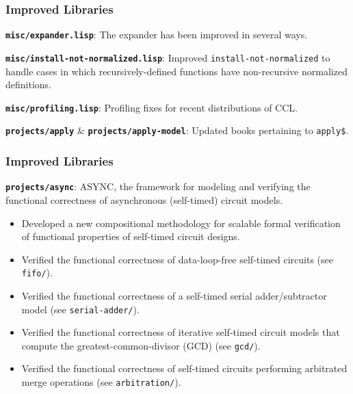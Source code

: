 \documentclass{beamer}
\newcommand{\code}[1]{\texttt{#1}}
\newcommand{\bookpath}[1]{\textbf{\code{#1}}}
\newcommand{\implibtitle}{\frametitle{Improved Libraries}}
\newcommand{\separation}{\vspace*{1ex}}
\begin{document}

\begin{frame}

\implibtitle

\bookpath{misc/expander.lisp}:
The expander has been improved in several ways.

\separation

\bookpath{misc/install-not-normalized.lisp}:
Improved \code{install-not-normalized} to handle cases in which
recursively-defined functions have non-recursive normalized
definitions.

\separation

\bookpath{misc/profiling.lisp}:
Profiling fixes for recent distributions of CCL.

\separation

\bookpath{projects/apply} \& \bookpath{projects/apply-model}:
Updated books pertaining to \code{apply\$}.

\end{frame}


\begin{frame}

\implibtitle

\bookpath{projects/async}:
ASYNC, the framework for modeling and verifying the functional correctness
of asynchronous (self-timed) circuit models.
\begin{itemize}
\item
Developed a new compositional methodology for scalable formal
verification of functional properties of self-timed circuit designs.
\item
Verified the functional correctness of data-loop-free self-timed
circuits (see \code{fifo/}).
\item
Verified the functional correctness of a self-timed serial
adder/subtractor model (see \code{serial-adder/}).
\item
Verified the functional correctness of iterative self-timed circuit
models that compute the greatest-common-divisor (GCD) (see \code{gcd/}).
\item
Verified the functional correctness of self-timed circuits performing
arbitrated merge operations (see \code{arbitration/}).
\end{itemize}

\end{frame}
\end{document}
